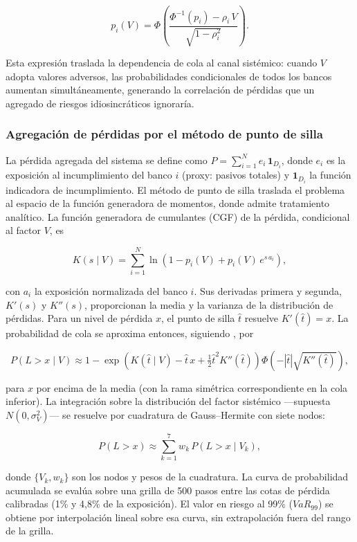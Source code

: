 \[ p_i(V) = \Phi\!\left(\frac{\Phi^{-1}(p_i) - \rho_i\,V}{\sqrt{1-\rho_i^{2}}}\right). \]

Esta expresión traslada la dependencia de cola al canal sistémico: cuando $V$ adopta valores adversos, las probabilidades condicionales de todos los bancos aumentan simultáneamente, generando la correlación de pérdidas que un agregado de riesgos idiosincráticos ignoraría.

\subsubsection{Agregación de pérdidas por el método de punto de silla}

La pérdida agregada del sistema se define como $P = \sum_{i=1}^{N} e_i\,\mathbf{1}_{D_i}$, donde $e_i$ es la exposición al incumplimiento del banco $i$ (proxy: pasivos totales) y $\mathbf{1}_{D_i}$ la función indicadora de incumplimiento. El método de punto de silla \citep{MartinThompsonBrowne2001} traslada el problema al espacio de la función generadora de momentos, donde admite tratamiento analítico. La función generadora de cumulantes (CGF) de la pérdida, condicional al factor $V$, es

\[ K(s\mid V) = \sum_{i=1}^{N} \ln\!\left(1 - p_i(V) + p_i(V)\,e^{s\,a_i}\right), \]

con $a_i$ la exposición normalizada del banco $i$. Sus derivadas primera y segunda, $K'(s)$ y $K''(s)$, proporcionan la media y la varianza de la distribución de pérdidas. Para un nivel de pérdida $x$, el punto de silla $\hat t$ resuelve $K'(\hat t) = x$. La probabilidad de cola se aproxima entonces, siguiendo \citet{MartinThompsonBrowne2001}, por

\[ P(L > x \mid V) \approx 1 - \exp\!\left(K(\hat t\mid V) - \hat t\,x + \tfrac{1}{2}\hat t^{2} K''(\hat t)\right)\Phi\!\left(-|\hat t|\sqrt{K''(\hat t)}\right), \]

para $x$ por encima de la media (con la rama simétrica correspondiente en la cola inferior). La integración sobre la distribución del factor sistémico —supuesta $N(0,\sigma_V^{2})$— se resuelve por cuadratura de Gauss–Hermite con siete nodos:

\[ P(L > x) \approx \sum_{k=1}^{7} w_k\,P(L > x \mid V_k), \]

donde $\{V_k, w_k\}$ son los nodos y pesos de la cuadratura. La curva de probabilidad acumulada se evalúa sobre una grilla de 500 pasos entre las cotas de pérdida calibradas (1\% y 4,8\% de la exposición). El valor en riesgo al 99\% ($VaR_{99}$) se obtiene por interpolación lineal sobre esa curva, sin extrapolación fuera del rango de la grilla.

